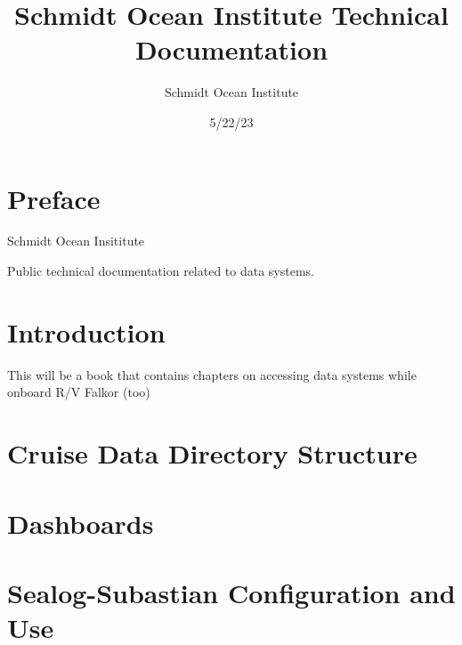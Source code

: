 \documentclass[
  letterpaper,
  DIV=11,
  numbers=noendperiod]{scrreprt}
\title{Schmidt Ocean Institute Technical Documentation}
\author{Schmidt Ocean Institute}
\date{5/22/23}
\renewcommand*\contentsname{Table of contents}
\newcommand\contentsname{Table of contents}
\begin{document}
\maketitle
\ifdefined\Shaded\renewenvironment{Shaded}{\begin{tcolorbox}[frame hidden, borderline west={3pt}{0pt}{shadecolor}, enhanced, interior hidden, sharp corners, boxrule=0pt, breakable]}{\end{tcolorbox}}\fi

\renewcommand*\contentsname{Table of contents}
{
\hypersetup{linkcolor=}
\setcounter{tocdepth}{2}
\tableofcontents
}

\hypertarget{preface}{%
\chapter*{Preface}\label{preface}}


Schmidt Ocean Insititute

Public technical documentation related to data systems.


\hypertarget{introduction}{%
\chapter{Introduction}\label{introduction}}

This will be a book that contains chapters on accessing data systems
while onboard R/V Falkor (too)


\hypertarget{cruise-data-directory-structure}{%
\chapter{Cruise Data Directory
Structure}\label{cruise-data-directory-structure}}


\hypertarget{dashboards}{%
\chapter{Dashboards}\label{dashboards}}


\hypertarget{sealog-subastian-configuration-and-use}{%
\chapter{Sealog-Subastian Configuration and
Use}\label{sealog-subastian-configuration-and-use}}
\end{document}
